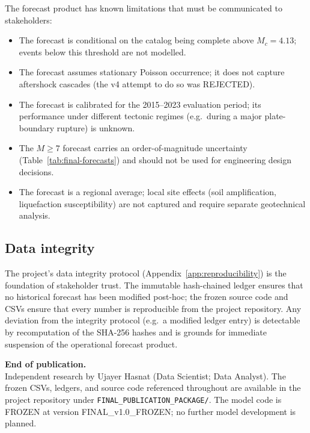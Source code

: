 \documentclass[10pt,a4paper,twocolumn]{article}
\begin{document}
The forecast product has known limitations that must be communicated to stakeholders:

\begin{itemize}[leftmargin=1.2em,itemsep=2pt,topsep=2pt]
\item The forecast is conditional on the catalog being complete above $M_c=4.13$; events below this threshold are not modelled.
\item The forecast assumes stationary Poisson occurrence; it does not capture aftershock cascades (the v4 attempt to do so was REJECTED).
\item The forecast is calibrated for the 2015--2023 evaluation period; its performance under different tectonic regimes (e.g.\ during a major plate-boundary rupture) is unknown.
\item The $M\geq7$ forecast carries an order-of-magnitude uncertainty (Table~\ref{tab:final-forecasts}) and should not be used for engineering design decisions.
\item The forecast is a regional average; local site effects (soil amplification, liquefaction susceptibility) are not captured and require separate geotechnical analysis.
\end{itemize}

\subsection{Data integrity}

The project's data integrity protocol (Appendix~\ref{app:reproducibility}) is the foundation of stakeholder trust. The immutable hash-chained ledger ensures that no historical forecast has been modified post-hoc; the frozen source code and CSVs ensure that every number is reproducible from the project repository. Any deviation from the integrity protocol (e.g.\ a modified ledger entry) is detectable by recomputation of the SHA-256 hashes and is grounds for immediate suspension of the operational forecast product.

\vspace{1.0em}
\noindent\textbf{\color{accent} End of publication.}\\
{\small Independent research by Ujayer Hasnat (Data Scientist; Data Analyst). The frozen CSVs, ledgers, and source code referenced throughout are available in the project repository under \texttt{FINAL\_PUBLICATION\_PACKAGE/}. The model code is FROZEN at version FINAL\_v1.0\_FROZEN; no further model development is planned.}
\end{document}
